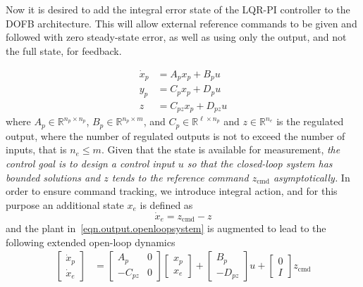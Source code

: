Now it is desired to add the integral error state of the LQR-PI controller to the DOFB architecture.
This will allow external reference commands to be given and followed with zero steady-state error, as well as using only the output, and not the full state, for feedback.

\begin{equation}
  \label{eqn.output.openloopsystem}
  \begin{split}
    \dot{x}_{p}&=A_{p}x_{p}+B_{p}u \\
    y_{p}&=C_{p}x_{p}+D_{p}u \\
    z&=C_{pz}x_{p}+D_{pz}u
  \end{split}
\end{equation}
where $A_{p}\in\mathbb{R}^{n_{p}\times n_{p}}$, $B_{p}\in\mathbb{R}^{n_{p}\times m}$, and $C_{p}\in\mathbb{R}^{\ell\times n_{p}}$ and $z\in\mathbb{R}^{n_{e}}$ is the regulated output, where the number of regulated outputs is not to exceed the number of inputs, that is $n_{e}\leq m$.
Given that the state is available for measurement, \emph{the control goal is to design a control input $u$ so that the closed-loop system has bounded solutions and $z$ tends to the reference command $z_{\text{cmd}}$ asymptotically.}
In order to ensure command tracking, we introduce integral action, and for this purpose an additional state $x_e$ is defined as
\begin{equation*}
  \dot{x}_{e}=z_{\text{cmd}}-z
\end{equation*}
and the plant in~\eqref{eqn.output.openloopsystem} is augmented to lead to the following extended open-loop dynamics
\begin{equation}
  \label{eqn.output.uncsystemfull}
  \begin{split}
    \begin{bmatrix}
      \dot{x}_{p} \\
      \dot{x}_{e}
    \end{bmatrix}
    &=
    \begin{bmatrix}
      A_{p} & 0 \\
      -C_{pz} & 0
    \end{bmatrix}
    \begin{bmatrix}
      x_{p} \\
      x_{e}
    \end{bmatrix}
    +
    \begin{bmatrix}
      B_{p} \\
      -D_{pz}
    \end{bmatrix} u
    +
    \begin{bmatrix}
      0 \\
      I
    \end{bmatrix}z_{\text{cmd}} \\
  \end{split}
\end{equation}
